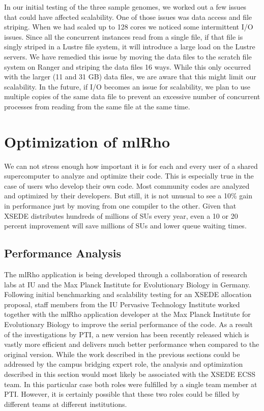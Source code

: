 \documentclass{sig-alternate}
\begin{document}
In our initial testing of the three sample genomes, we worked out a few issues that could have affected
scalability. One of those issues was data access and file striping. When we had scaled up to 128 cores we
noticed some intermittent I/O issues. Since all the concurrent instances read from a single file, if that file is
singly striped in a Lustre file system, it will introduce a large load on the Lustre servers. We have remedied
this issue by moving the data files to the scratch file system on Ranger and striping the data files 16
ways. While this only occurred with the larger (11 and 31 GB) data files, we are aware that this might limit
our scalability. In the future, if I/O becomes an issue for scalability, we plan to use multiple copies of the
same data file to prevent an excessive number of concurrent processes from reading from the same file at the
same time.


\section{Optimization of mlRho}\label{sec:optimization}
We can not stress enough how important it is for each and every user of a shared supercomputer to analyze and optimize their code. This is especially true in the case of users who develop their own code. Most community codes are analyzed and optimized by their developers. But still, it is not unusual to see a 10\% gain in performance just by moving from one compiler to the other. Given that XSEDE distributes hundreds of millions of SUs every year, even a 10 or 20 percent improvement will save millions of SUs and lower queue waiting times. 
\subsection{Performance Analysis}\label{subsec:analysis}
The mlRho application is being developed through a collaboration of research labs at IU and the
Max Planck Institute for Evolutionary Biology in Germany. Following initial benchmarking and scalability
testing for an XSEDE allocation proposal, staff members from the IU Pervasive Technology Institute worked
together with the mlRho application developer at the Max Planck Institute for Evolutionary
Biology to improve the serial performance of the code. As a result of the investigations by PTI, a new version
has been recently released which is vastly more efficient and delivers much better performance when compared to
the original version. While the work described in the previous sections could be addressed by the campus
bridging expert role, the analysis and optimization described in this section would most likely be associated with
the XSEDE ECSS team. In this particular case both roles were fulfilled by a single team member at PTI. However,
it is certainly possible that these two roles could be filled by different teams at different institutions.
\end{document}
